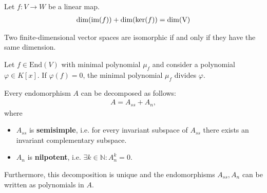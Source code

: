 
    \begin{theorem}\label{linalgebra:dimension_theorem}
        Let $f:V\rightarrow W$ be a linear map.
        \begin{gather}
            \dim(\text{\upshape im}(f)) + \dim(\text{\upshape ker}(f)) = \dim(\text{\upshape V})
        \end{gather}
    \end{theorem}
    \begin{result}\label{linalgebra:dimension_isomorphism}
        Two finite-dimensional vector spaces are isomorphic if and only if they have the same dimension.
    \end{result}

    \begin{property}\label{linalgebra:minimal_polynomial_divisor}
        Let $f\in\text{End}(V)$ with minimal polynomial $\mu_f$ and consider a polynomial $\varphi\in K[x]$. If $\varphi(f) = 0$, the minimal polynomial $\mu_f$ divides $\varphi$.
    \end{property}

    \begin{property}\label{linalgebra:jordan_chevalley}
        Every endomorphism $A$ can be decomposed as follows:
        \begin{gather}
            A = A_{ss} + A_n,
        \end{gather}
        where
        \begin{itemize}
            \item $A_{ss}$ is \textbf{semisimple}, i.e. for every invariant subspace of $A_{ss}$ there exists an invariant complementary subspace.
            \item $A_n$ is \textbf{nilpotent}, i.e. $\exists k\in\mathbb{N}: A_n^k = 0$.
        \end{itemize}
        Furthermore, this decomposition is unique and the endomorphisms $A_{ss}, A_n$ can be written as polynomials in $A$.
    \end{property}


